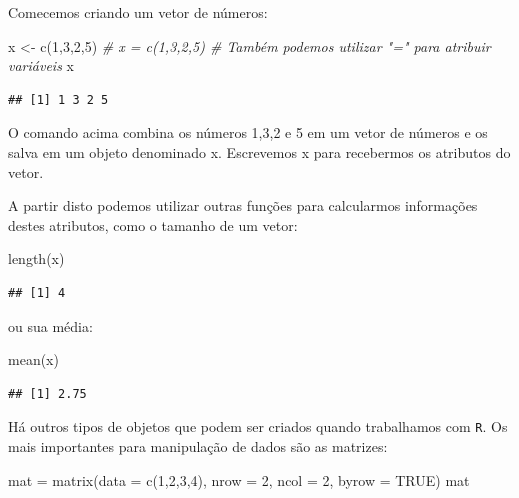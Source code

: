 \documentclass[
]{book}
\newenvironment{Shaded}{\begin{snugshade}}{\end{snugshade}}
\newcommand{\AttributeTok}[1]{\textcolor[rgb]{0.77,0.63,0.00}{#1}}
\newcommand{\CommentTok}[1]{\textcolor[rgb]{0.56,0.35,0.01}{\textit{#1}}}
\newcommand{\ConstantTok}[1]{\textcolor[rgb]{0.00,0.00,0.00}{#1}}
\newcommand{\DecValTok}[1]{\textcolor[rgb]{0.00,0.00,0.81}{#1}}
\newcommand{\FunctionTok}[1]{\textcolor[rgb]{0.00,0.00,0.00}{#1}}
\newcommand{\NormalTok}[1]{#1}
\newcommand{\OtherTok}[1]{\textcolor[rgb]{0.56,0.35,0.01}{#1}}
\begin{document}
Comecemos criando um vetor de números:

\begin{Shaded}
\begin{Highlighting}[]
\NormalTok{x }\OtherTok{\textless{}{-}} \FunctionTok{c}\NormalTok{(}\DecValTok{1}\NormalTok{,}\DecValTok{3}\NormalTok{,}\DecValTok{2}\NormalTok{,}\DecValTok{5}\NormalTok{)}
\CommentTok{\# x = c(1,3,2,5) \# Também podemos utilizar "=" para atribuir variáveis}
\NormalTok{x}
\end{Highlighting}
\end{Shaded}

\begin{verbatim}
## [1] 1 3 2 5
\end{verbatim}

O comando acima combina os números 1,3,2 e 5 em um vetor de números e os salva em um objeto denominado x. Escrevemos x para recebermos os atributos do vetor.

A partir disto podemos utilizar outras funções para calcularmos informações destes atributos, como o tamanho de um vetor:

\begin{Shaded}
\begin{Highlighting}[]
\FunctionTok{length}\NormalTok{(x)}
\end{Highlighting}
\end{Shaded}

\begin{verbatim}
## [1] 4
\end{verbatim}

ou sua média:

\begin{Shaded}
\begin{Highlighting}[]
\FunctionTok{mean}\NormalTok{(x)}
\end{Highlighting}
\end{Shaded}

\begin{verbatim}
## [1] 2.75
\end{verbatim}

Há outros tipos de objetos que podem ser criados quando trabalhamos com \texttt{R}. Os mais importantes para manipulação de dados são as matrizes:

\begin{Shaded}
\begin{Highlighting}[]
\NormalTok{mat }\OtherTok{=} \FunctionTok{matrix}\NormalTok{(}\AttributeTok{data =} \FunctionTok{c}\NormalTok{(}\DecValTok{1}\NormalTok{,}\DecValTok{2}\NormalTok{,}\DecValTok{3}\NormalTok{,}\DecValTok{4}\NormalTok{), }\AttributeTok{nrow =} \DecValTok{2}\NormalTok{, }\AttributeTok{ncol =} \DecValTok{2}\NormalTok{,}
           \AttributeTok{byrow =} \ConstantTok{TRUE}\NormalTok{)}
\NormalTok{mat}
\end{Highlighting}
\end{Shaded}
\end{document}
